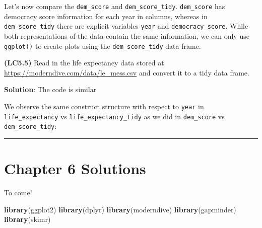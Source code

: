 \documentclass[12pt, krantz2,]{krantz}
\makeatletter
\newenvironment{Shaded}{\begin{snugshade}}{\end{snugshade}}
\newcommand{\KeywordTok}[1]{\textcolor[rgb]{0.27,0.27,0.27}{\textbf{#1}}}
\newcommand{\NormalTok}[1]{#1}
\newenvironment{kframe}{%
\medskip{}
\setlength{\fboxsep}{.8em}
 \def\at@end@of@kframe{}%
 \ifinner\ifhmode%
  \def\at@end@of@kframe{\end{minipage}}%
  \begin{minipage}{\columnwidth}%
 \fi\fi%
 \def\FrameCommand##1{\hskip\@totalleftmargin \hskip-\fboxsep
 \colorbox{shadecolor}{##1}\hskip-\fboxsep
     \hskip-\linewidth \hskip-\@totalleftmargin \hskip\columnwidth}%
 \MakeFramed {\advance\hsize-\width
   \@totalleftmargin\z@ \linewidth\hsize
   \@setminipage}}%
 {\par\unskip\endMakeFramed%
 \at@end@of@kframe}
\renewenvironment{Shaded}{\begin{kframe}}{\end{kframe}}
\makeatother
\begin{document}
Let's now compare the \texttt{dem\_score} and \texttt{dem\_score\_tidy}. \texttt{dem\_score} has democracy score information for each year in columns, whereas in \texttt{dem\_score\_tidy} there are explicit variables \texttt{year} and \texttt{democracy\_score}. While both representations of the data contain the same information, we can only use \texttt{ggplot()} to create plots using the \texttt{dem\_score\_tidy} data frame.

\textbf{(LC5.5)} Read in the life expectancy data stored at \url{https://moderndive.com/data/le_mess.csv} and convert it to a tidy data frame.

\textbf{Solution}: The code is similar

We observe the same construct structure with respect to \texttt{year} in \texttt{life\_expectancy} vs \texttt{life\_expectancy\_tidy} as we did in \texttt{dem\_score} vs \texttt{dem\_score\_tidy}:

\begin{center}\rule{0.5\linewidth}{\linethickness}\end{center}

\hypertarget{chapter-6-solutions}{%
\section{Chapter 6 Solutions}\label{chapter-6-solutions}}

To come!

\begin{Shaded}
\begin{Highlighting}[]
\KeywordTok{library}\NormalTok{(ggplot2)}
\KeywordTok{library}\NormalTok{(dplyr)}
\KeywordTok{library}\NormalTok{(moderndive)}
\KeywordTok{library}\NormalTok{(gapminder)}
\KeywordTok{library}\NormalTok{(skimr)}
\end{Highlighting}
\end{Shaded}



\backmatter
\printindex
\end{document}
